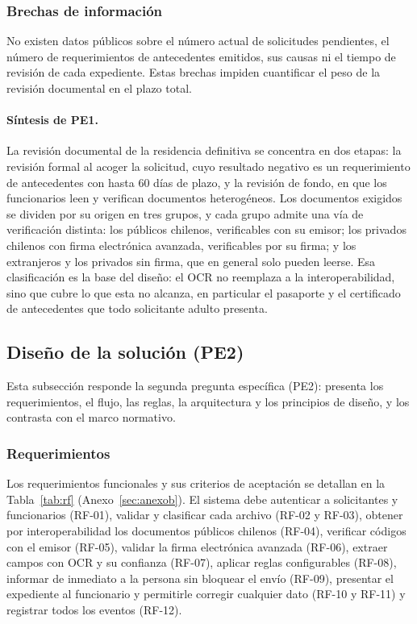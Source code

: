 \documentclass[11pt,a4paper]{article}
\begin{document}
\subsubsection{Brechas de información}
No existen datos públicos sobre el número actual de solicitudes pendientes, el número de requerimientos de antecedentes emitidos, sus causas ni el tiempo de revisión de cada expediente. Estas brechas impiden cuantificar el peso de la revisión documental en el plazo total.

\paragraph{Síntesis de PE1.} La revisión documental de la residencia definitiva se concentra en dos etapas: la revisión formal al acoger la solicitud, cuyo resultado negativo es un requerimiento de antecedentes con hasta 60 días de plazo, y la revisión de fondo, en que los funcionarios leen y verifican documentos heterogéneos. Los documentos exigidos se dividen por su origen en tres grupos, y cada grupo admite una vía de verificación distinta: los públicos chilenos, verificables con su emisor; los privados chilenos con firma electrónica avanzada, verificables por su firma; y los extranjeros y los privados sin firma, que en general solo pueden leerse. Esa clasificación es la base del diseño: el OCR no reemplaza a la interoperabilidad, sino que cubre lo que esta no alcanza, en particular el pasaporte y el certificado de antecedentes que todo solicitante adulto presenta.

\subsection{Diseño de la solución (PE2)}
\label{sec:diseno}
Esta subsección responde la segunda pregunta específica (PE2): presenta los requerimientos, el flujo, las reglas, la arquitectura y los principios de diseño, y los contrasta con el marco normativo.

\subsubsection{Requerimientos}
\label{sec:requerimientos}
Los requerimientos funcionales y sus criterios de aceptación se detallan en la Tabla~\ref{tab:rf} (Anexo~\ref{sec:anexob}). El sistema debe autenticar a solicitantes y funcionarios (RF-01), validar y clasificar cada archivo (RF-02 y RF-03), obtener por interoperabilidad los documentos públicos chilenos (RF-04), verificar códigos con el emisor (RF-05), validar la firma electrónica avanzada (RF-06), extraer campos con OCR y su confianza (RF-07), aplicar reglas configurables (RF-08), informar de inmediato a la persona sin bloquear el envío (RF-09), presentar el expediente al funcionario y permitirle corregir cualquier dato (RF-10 y RF-11) y registrar todos los eventos (RF-12).
\end{document}
